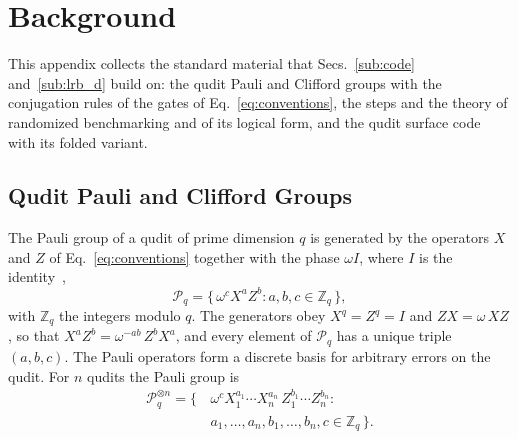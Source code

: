 \section{Background}
\label{app:background}\label{sec:bg}

This appendix collects the standard material that Secs.~\ref{sub:code} and~\ref{sub:lrb_d} build on: the qudit Pauli and Clifford groups with the conjugation rules of the gates of Eq.~\eqref{eq:conventions}, the steps and the theory of randomized benchmarking and of its logical form, and the qudit surface code with its folded variant.

\subsection{Qudit Pauli and Clifford Groups}
\label{app:background-groups}

The Pauli group of a qudit of prime dimension $q$ is generated by the operators $X$ and $Z$ of Eq.~\eqref{eq:conventions} together with the phase $\omega I$, where $I$ is the identity~\cite{Gottesman1999,Hostens2005,Wang2020,SarkarYoder2024},
\begin{equation}
  \mathcal{P}_q = \bigl\{\, \omega^c X^a Z^b : a, b, c \in \mathbb{Z}_q \,\bigr\},
\end{equation}
with $\mathbb{Z}_q$ the integers modulo $q$. The generators obey $X^q = Z^q = I$ and $Z X = \omega\, X Z$, so that $X^a Z^b = \omega^{-ab}\, Z^b X^a$, and every element of $\mathcal{P}_q$ has a unique triple $(a, b, c)$. The Pauli operators form a discrete basis for arbitrary errors on the qudit. For $n$ qudits the Pauli group is
\begin{equation}
  \begin{split}
    \mathcal{P}_q^{\otimes n}
    = \bigl\{\, &\omega^c
      X_1^{a_1} \cdots X_n^{a_n}\,
      Z_1^{b_1} \cdots Z_n^{b_n} : \\
      &a_1, \dots, a_n, b_1, \dots, b_n, c \in \mathbb{Z}_q
     \,\bigr\}.
  \end{split}
\end{equation}

